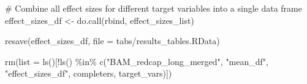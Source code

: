 \documentclass[
  letterpaper,
  DIV=11,
  numbers=noendperiod]{scrreprt}
\newenvironment{Shaded}{\begin{snugshade}}{\end{snugshade}}
\newcommand{\AttributeTok}[1]{\textcolor[rgb]{0.40,0.45,0.13}{#1}}
\newcommand{\CommentTok}[1]{\textcolor[rgb]{0.37,0.37,0.37}{#1}}
\newcommand{\FunctionTok}[1]{\textcolor[rgb]{0.28,0.35,0.67}{#1}}
\newcommand{\NormalTok}[1]{\textcolor[rgb]{0.00,0.23,0.31}{#1}}
\newcommand{\OtherTok}[1]{\textcolor[rgb]{0.00,0.23,0.31}{#1}}
\newcommand{\SpecialCharTok}[1]{\textcolor[rgb]{0.37,0.37,0.37}{#1}}
\newcommand{\StringTok}[1]{\textcolor[rgb]{0.13,0.47,0.30}{#1}}
\begin{document}
\begin{Shaded}
\begin{Highlighting}[]
\CommentTok{\# Combine all effect sizes for different target variables into a single data frame}
\NormalTok{effect\_sizes\_df }\OtherTok{\textless{}{-}} \FunctionTok{do.call}\NormalTok{(rbind, effect\_sizes\_list)}

\FunctionTok{resave}\NormalTok{(effect\_sizes\_df, }\AttributeTok{file =} \StringTok{\textquotesingle{}tabs/results\_tables.RData\textquotesingle{}}\NormalTok{)}
\end{Highlighting}
\end{Shaded}

\begin{Shaded}
\begin{Highlighting}[]
\FunctionTok{rm}\NormalTok{(}\AttributeTok{list =} \FunctionTok{ls}\NormalTok{()[}\SpecialCharTok{!}\FunctionTok{ls}\NormalTok{() }\SpecialCharTok{\%in\%} \FunctionTok{c}\NormalTok{(}\StringTok{"BAM\_redcap\_long\_merged"}\NormalTok{, }\StringTok{"mean\_df"}\NormalTok{, }\StringTok{"effect\_sizes\_df"}\NormalTok{, }\StringTok{\textquotesingle{}completers\textquotesingle{}}\NormalTok{, }\StringTok{\textquotesingle{}target\_vars\textquotesingle{}}\NormalTok{)])}
\end{Highlighting}
\end{Shaded}
\end{document}
